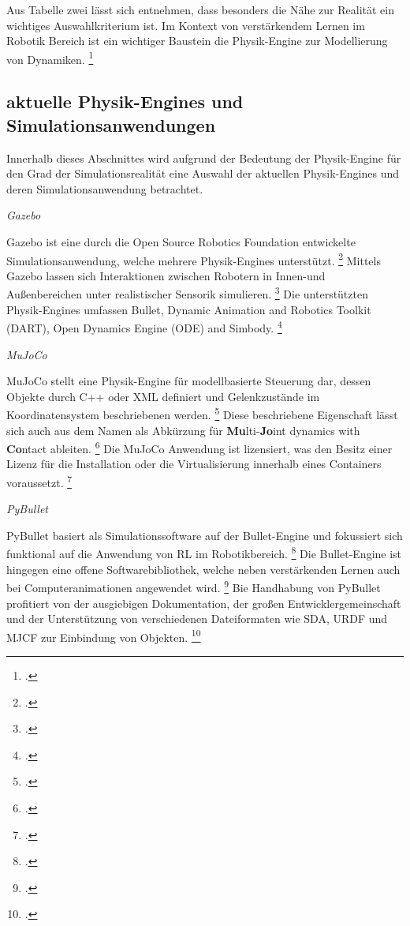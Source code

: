 Aus Tabelle zwei lässt sich entnehmen, dass besonders die Nähe zur Realität ein wichtiges Auswahlkriterium ist.
Im Kontext von verstärkendem Lernen im Robotik Bereich ist ein wichtiger Baustein die Physik-Engine zur Modellierung von Dynamiken. \footcite[Vgl.][S. 2]{Ayala.2020}

\subsection{aktuelle Physik-Engines und Simulationsanwendungen}
Innerhalb dieses Abschnittes wird aufgrund der Bedeutung der Physik-Engine für den Grad der Simulationsrealität eine Auswahl der aktuellen Physik-Engines und deren Simulationsanwendung betrachtet.

\textit{Gazebo}

Gazebo ist eine durch die Open Source Robotics Foundation entwickelte Simulationsanwendung, welche mehrere Physik-Engines unterstützt. \footcite[Vgl.][S. 7]{Ivaldi.2272014}
Mittels Gazebo lassen sich Interaktionen zwischen Robotern in Innen-und Außenbereichen unter realistischer Sensorik simulieren. \footcite[Vgl.][S. 4]{Ayala.2020}
Die unterstützten Physik-Engines umfassen Bullet, Dynamic Animation and Robotics Toolkit (DART), Open Dynamics Engine (ODE) and Simbody. \footcite[Vgl.][S. 3]{Korber.2021}

\textit{MuJoCo}

MuJoCo stellt eine Physik-Engine für modellbasierte Steuerung dar, dessen Objekte durch C++ oder XML definiert und Gelenkzustände im Koordinatensystem beschriebenen werden. \footcite[Vgl.][S. 1]{Todorov.2012} 
Diese beschriebene Eigenschaft lässt sich auch aus dem Namen als Abkürzung für \textbf{Mu}lti-\textbf{Jo}int dynamics with \textbf{Co}ntact ableiten. \footcite[Vgl.][S. 2]{Todorov.2012}
Die MuJoCo Anwendung ist lizensiert, was den Besitz einer Lizenz für die Installation oder die Virtualisierung innerhalb eines Containers voraussetzt. \footcite[Vgl.][S. 3]{Korber.2021}

\textit{PyBullet}

PyBullet basiert als Simulationssoftware auf der Bullet-Engine und fokussiert sich funktional auf die Anwendung von RL im Robotikbereich. \footcite[Vgl.][S. 3]{Korber.2021}
Die Bullet-Engine ist hingegen eine offene Softwarebibliothek, welche neben verstärkenden Lernen auch bei Computeranimationen angewendet wird. \footcite[Vgl.][S. 7]{Ivaldi.2272014}
Bie Handhabung von PyBullet profitiert von der ausgiebigen Dokumentation, der großen Entwicklergemeinschaft und der Unterstützung von verschiedenen Dateiformaten wie SDA, URDF und MJCF zur Einbindung von Objekten. \footcite[Vgl.][S. 6]{Korber.2021}

